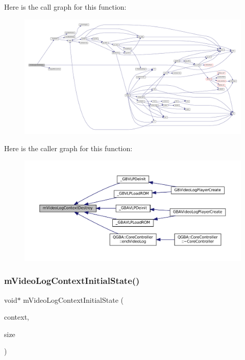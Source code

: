 Here is the call graph for this function\+:
\nopagebreak
\begin{figure}[H]
\begin{center}
\leavevmode
\includegraphics[width=350pt]{video-logger_8c_a300bc3d5849465d59ddaa92e6a338fb6_cgraph}
\end{center}
\end{figure}
Here is the caller graph for this function\+:
\nopagebreak
\begin{figure}[H]
\begin{center}
\leavevmode
\includegraphics[width=350pt]{video-logger_8c_a300bc3d5849465d59ddaa92e6a338fb6_icgraph}
\end{center}
\end{figure}
\mbox{\label{video-logger_8c_aa9a3f77cb1a532bdc62db67c0724697f}} 
\subsubsection{\texorpdfstring{m\+Video\+Log\+Context\+Initial\+State()}{mVideoLogContextInitialState()}}
{\footnotesize\ttfamily void$\ast$ m\+Video\+Log\+Context\+Initial\+State (\begin{DoxyParamCaption}\item[{struct m\+Video\+Log\+Context $\ast$}]{context,  }\item[{size\+\_\+t $\ast$}]{size }\end{DoxyParamCaption})}

